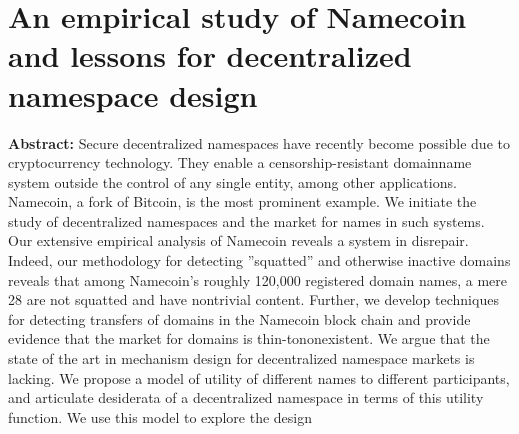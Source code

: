 \section{An empirical study of Namecoin and lessons for decentralized namespace design}

\textbf{Abstract:} 
Secure decentralized namespaces have recently become possible due to cryptocurrency technology. They enable a censorship-resistant domainname system outside the control of any single entity, among other applications. Namecoin, a fork of Bitcoin, is the most prominent example. We initiate the study of decentralized namespaces and the market for names in such systems. Our extensive empirical analysis of Namecoin reveals a system in disrepair. Indeed, our methodology for detecting ''squatted'' and otherwise inactive domains reveals that among Namecoin’s roughly 120,000 registered domain names, a mere 28 are not squatted and have nontrivial content. Further, we develop techniques for detecting transfers of domains in the Namecoin block chain and provide evidence that the market for domains is thin-tononexistent. We argue that the state of the art in mechanism design for decentralized namespace markets is lacking. We propose a model of utility of different names to different participants, and articulate desiderata of a decentralized namespace in terms of this utility function. We use this model to explore the design
